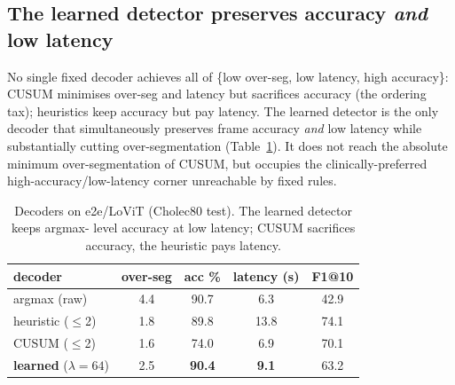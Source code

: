 \documentclass[11pt]{article}
\begin{document}
\subsection{The learned detector preserves accuracy \emph{and} low latency}
\label{sec:learned-results}
No single fixed decoder achieves all of \{low over-seg, low latency, high accuracy\}:
CUSUM minimises over-seg and latency but sacrifices accuracy (the ordering tax);
heuristics keep accuracy but pay latency. The learned detector is the only decoder
that simultaneously preserves frame accuracy \emph{and} low latency while
substantially cutting over-segmentation (Table~\ref{tab:learned}). It does not reach
the absolute minimum over-segmentation of CUSUM, but occupies the
clinically-preferred high-accuracy/low-latency corner unreachable by fixed rules.

\begin{table}[t]\centering\small
\caption{Decoders on e2e/LoViT (Cholec80 test). The learned detector keeps argmax-
level accuracy at low latency; CUSUM sacrifices accuracy, the heuristic pays latency.}
\label{tab:learned}
\begin{tabular}{lcccc}
\toprule
decoder & over-seg & acc \% & latency (s) & F1@10 \\
\midrule
argmax (raw)         & 4.4 & 90.7 & 6.3 & 42.9 \\
heuristic ($\le$2)   & 1.8 & 89.8 & 13.8 & 74.1 \\
CUSUM ($\le$2)       & 1.6 & 74.0 & 6.9 & 70.1 \\
\textbf{learned} ($\lambda{=}64$) & 2.5 & \textbf{90.4} & \textbf{9.1} & 63.2 \\
\bottomrule
\end{tabular}
\end{table}
\end{document}

